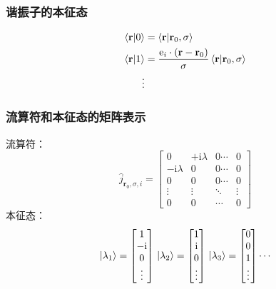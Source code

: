 \documentclass[UTF8]{beamer}
\begin{document}
\begin{frame}
    \frametitle{谐振子的本征态}
    \begin{align}
        \braket{\mathbf{r}|0} & =\braket{\mathbf{r}|\mathbf{r}_0,\sigma}\nonumber                                                 \\
        \braket{\mathbf{r}|1} & =\frac{\mathrm{e}_i\cdot(\mathbf{r}-\mathbf{r}_0)}{\sigma}\braket{\mathbf{r}|\mathbf{r}_0,\sigma} \\
        \vdots \nonumber
    \end{align}
\end{frame}
\begin{frame}
    \frametitle{流算符和本征态的矩阵表示}
    流算符：
    \begin{equation*}
        \hat{j}_{\mathbf{r}_0,\sigma,i}=
        \begin{bmatrix}
            0                  & +\mathrm{i}\lambda & 0\cdots & 0      \\
            -\mathrm{i}\lambda & 0                  & 0\cdots & 0      \\
            0                  & 0                  & 0\cdots & 0      \\
            \vdots             & \vdots             & \ddots  & \vdots \\
            0                  & 0                  & \cdots  & 0
        \end{bmatrix}
    \end{equation*}
    本征态：
    \begin{equation*}
        \,\ket{\lambda_{1}}=
        \begin{bmatrix}
            1           \\
            -\mathrm{i} \\
            0           \\
            \vdots
        \end{bmatrix}
        \,\ket{\lambda_{2}}=
        \begin{bmatrix}
            1          \\
            \mathrm{i} \\
            0          \\
            \vdots
        \end{bmatrix}
        \,\ket{\lambda_{3}}=
        \begin{bmatrix}
            0 \\
            0 \\
            1 \\
            \vdots
        \end{bmatrix}
        \cdots
    \end{equation*}
\end{frame}
\end{document}
